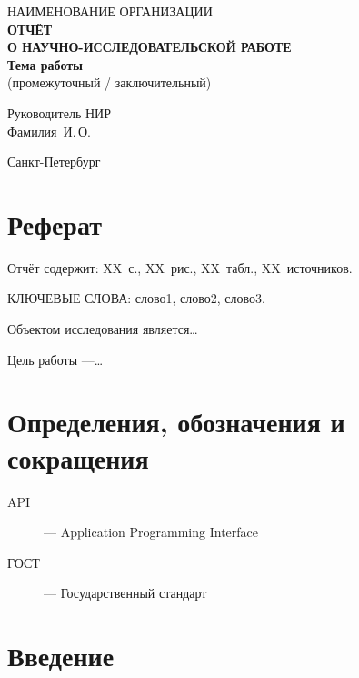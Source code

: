 \documentclass[12pt, a4paper]{article}
\begin{document}
\begin{titlepage}
  \centering
  {\small НАИМЕНОВАНИЕ ОРГАНИЗАЦИИ}\\[2cm]
  \textbf{ОТЧЁТ}\\[0.5cm]
  {\large\textbf{О НАУЧНО-ИССЛЕДОВАТЕЛЬСКОЙ РАБОТЕ}}\\[0.5cm]
  {\large\textbf{Тема работы}}\\[0.5cm]
  (промежуточный / заключительный)\\[3cm]

  \begin{flushleft}
    \hspace{8cm} Руководитель НИР \\
    \hspace{8cm} \underline{\hspace{3cm}} Фамилия~И.\,О. \\
  \end{flushleft}
  \vfill
  {\small Санкт-Петербург \\ \the\year}
\end{titlepage}

\newpage
\section*{Реферат}
Отчёт содержит: XX~с., XX~рис., XX~табл., XX~источников.

КЛЮЧЕВЫЕ СЛОВА: слово1, слово2, слово3.

Объектом исследования является\ldots

Цель работы ---\ldots

\newpage
\tableofcontents
\newpage

\section*{Определения, обозначения и сокращения}

\begin{description}
  \item[API] --- Application Programming Interface
  \item[ГОСТ] --- Государственный стандарт
\end{description}

\newpage
\section*{Введение}
\end{document}

